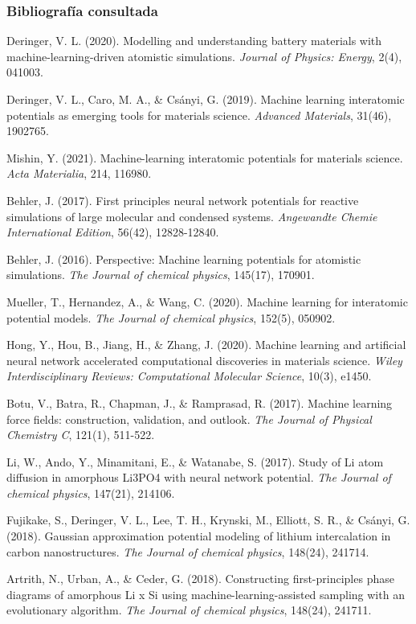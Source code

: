 \documentclass[aspectratio=169]{beamer}
\begin{document}
    \begin{frame}
        \frametitle{Bibliografía consultada}

        \tiny{
            Deringer, V. L. (2020). Modelling and understanding battery 
                materials with machine-learning-driven atomistic simulations.
                \textit{Journal of Physics: Energy}, 2(4), 041003.
            
            Deringer, V. L., Caro, M. A., \& Csányi, G. (2019). Machine 
                learning interatomic potentials as emerging tools for materials 
                science. \textit{Advanced Materials}, 31(46), 1902765.

            Mishin, Y. (2021). Machine-learning interatomic potentials for 
                materials science. \textit{Acta Materialia}, 214, 116980.

            Behler, J. (2017). First principles neural network potentials 
                for reactive simulations of large molecular and condensed systems. 
                \textit{Angewandte Chemie International Edition}, 56(42), 12828-12840.

            Behler, J. (2016). Perspective: Machine learning potentials 
                for atomistic simulations. \textit{The Journal of chemical 
                physics}, 145(17), 170901.

            Mueller, T., Hernandez, A., \& Wang, C. (2020). Machine learning 
                for interatomic potential models. \textit{The Journal of chemical 
                physics}, 152(5), 050902.

            Hong, Y., Hou, B., Jiang, H., \& Zhang, J. (2020). Machine 
                learning and artificial neural network accelerated computational 
                discoveries in materials science. \textit{Wiley Interdisciplinary 
                Reviews: Computational Molecular Science}, 10(3), e1450.

            Botu, V., Batra, R., Chapman, J., \& Ramprasad, R. (2017). 
                Machine learning force fields: construction, validation, and 
                outlook. \textit{The Journal of Physical Chemistry C}, 121(1), 
                511-522.

            Li, W., Ando, Y., Minamitani, E., \& Watanabe, S. (2017). 
                Study of Li atom diffusion in amorphous Li3PO4 with neural 
                network potential. \textit{The Journal of chemical physics}, 
                147(21), 214106.

            Fujikake, S., Deringer, V. L., Lee, T. H., Krynski, M., 
                Elliott, S. R., \& Csányi, G. (2018). Gaussian approximation 
                potential modeling of lithium intercalation in carbon 
                nanostructures. \textit{The Journal of chemical physics}, 148(24), 241714.

            Artrith, N., Urban, A., \& Ceder, G. (2018). Constructing 
                first-principles phase diagrams of amorphous Li x Si using 
                machine-learning-assisted sampling with an evolutionary algorithm. 
                \textit{The Journal of chemical physics}, 148(24), 241711.
        }

    \end{frame}
\end{document}
